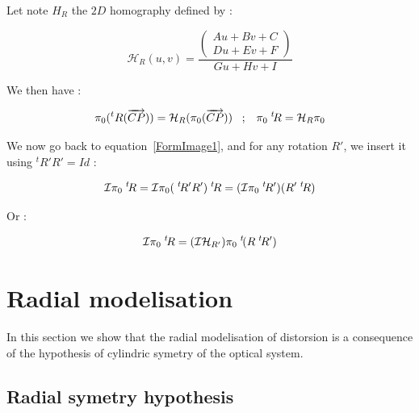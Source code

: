 Let note $H_R$ the $2D$  homography defined by :

\begin{equation}
  \mathcal{H}_R(u,v) =  \frac{\begin{pmatrix} Au+Bv+C \\  Du+Ev+F  \end{pmatrix}} {Gu+Hv+I}
\end{equation}

We then have :

\begin{equation}
	\pi_0(^t R(\overrightarrow{CP}))  = \mathcal{H}_R  (\pi_0 (\overrightarrow{CP}))
\;\;\;  ;  \;\;\;
        \pi_0  \; ^{t} \!  R = \mathcal{H}_R  \pi_0
\end{equation}

We now go back to equation~\ref{FormImage1}, and for any rotation $R'$, we insert it using $^t R'R'=Id$ :

\begin{equation}
	\mathcal{I} \pi_0   \; ^{t} \! R = \mathcal{I}  \pi_0   (\; ^{t} \! R' R')  \; ^{t} \! R = ( \mathcal{I}  \pi_0   \; ^{t} \! R')  (R' \; ^{t} \! R )
\end{equation}

Or :

\begin{equation}
	   \mathcal{I} \pi_0   \; ^{t} \! R 
	   = (\mathcal{I} \mathcal{H}_{R'})   \pi_0   \; ^{t} \! (R \; ^{t} \! R')  \label{FormRotCalib}
\end{equation}



\section{Radial modelisation}

\label{RadMod}

In this section we  show that the radial modelisation of distorsion is a consequence
of the hypothesis of cylindric symetry of the optical system.


\subsection{Radial symetry hypothesis}

